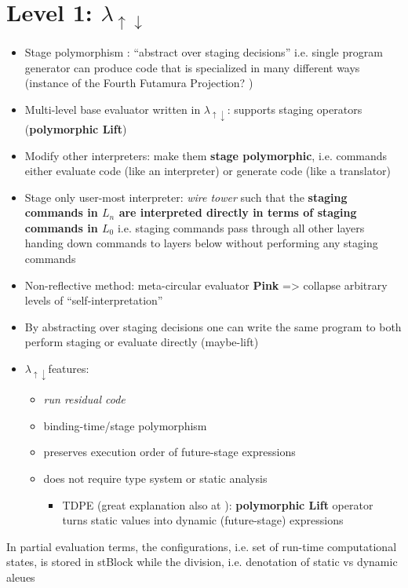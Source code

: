 \documentclass[fleqn]{article}
\theoremstyle{definition}
\newcommand{\mslang}{$\lambda_{\uparrow\downarrow}$}
\begin{document}
\section{Level 1: \mslang}
\begin{itemize}
	\item Stage polymorphism \cite{ofenbeck2017staging}: ``abstract over staging decisions'' i.e. single program generator can produce code that is specialized in many different ways (instance of the Fourth Futamura Projection? \cite{gluck2009there}) 
	\item Multi-level base evaluator written in \mslang: supports staging operators (\textbf{polymorphic Lift})
	\item Modify other interpreters: make them \textbf{stage polymorphic}, i.e. commands either evaluate code (like an interpreter) or generate code (like a translator)
	\item Stage only user-most interpreter: \textit{wire tower} such that the \textbf{staging commands in $L_{n}$ are interpreted directly in terms of staging commands in $L_{0}$} i.e. staging commands pass through all other layers handing down commands to layers below without performing any staging commands
	\item Non-reflective method: meta-circular evaluator \textbf{Pink} => collapse arbitrary levels of ``self-interpretation''
	\item By abstracting over staging decisions one can write the same program to both perform staging or evaluate directly \cite{amin2017collapsing} (maybe-lift)
	\item \mslang features:
	\begin{itemize}
		\item \textit{run residual code}
		\item binding-time/stage polymorphism \cite{henglein1994polymorphic}
		\item preserves execution order of future-stage expressions
		\item does not require type system or static analysis
		\begin{itemize}
			\item TDPE \cite{danvy1999type} (great explanation also at \cite{grobauer2001second}): \textbf{polymorphic Lift} operator turns static values into dynamic (future-stage) expressions
		\end{itemize}
	\end{itemize}
\end{itemize}

In partial evaluation terms, the configurations, i.e. set of run-time computational states, is stored in stBlock while the division, i.e. denotation of static vs dynamic aleues 
\end{document}
